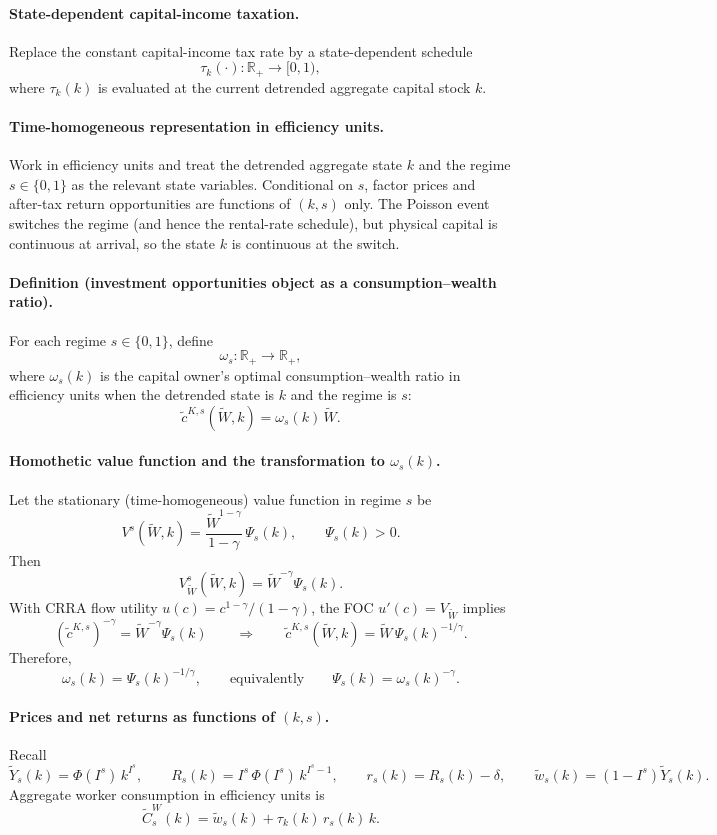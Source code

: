 \documentclass{article}
\begin{document}
\paragraph{State-dependent capital-income taxation.}
Replace the constant capital-income tax rate by a state-dependent schedule
$$
\tau_k(\cdot):\mathbb{R}_+\to[0,1),
$$
where $\tau_k(k)$ is evaluated at the current detrended aggregate capital stock $k$.

\paragraph{Time-homogeneous representation in efficiency units.}
Work in efficiency units and treat the detrended aggregate state $k$ and the regime $s\in\{0,1\}$ as the relevant state variables.
Conditional on $s$, factor prices and after-tax return opportunities are functions of $(k,s)$ only.
The Poisson event switches the regime (and hence the rental-rate schedule), but physical capital is continuous at arrival, so the state $k$ is continuous at the switch.

\paragraph{Definition (investment opportunities object as a consumption--wealth ratio).}
For each regime $s\in\{0,1\}$, define
$$
\omega_s:\mathbb{R}_+\to\mathbb{R}_+,
$$
where $\omega_s(k)$ is the capital owner's optimal consumption--wealth ratio in efficiency units when the detrended state is $k$ and the regime is $s$:
$$
\tilde c^{K,s}(\tilde W,k) = \omega_s(k)\,\tilde W.
$$

\paragraph{Homothetic value function and the transformation to $\omega_s(k)$.}
Let the stationary (time-homogeneous) value function in regime $s$ be
$$
V^s(\tilde W,k)=\frac{\tilde W^{1-\gamma}}{1-\gamma}\,\Psi_s(k),
\qquad \Psi_s(k)>0.
$$
Then
$$
V^s_{\tilde W}(\tilde W,k)=\tilde W^{-\gamma}\Psi_s(k).
$$
With CRRA flow utility $u(c)=c^{1-\gamma}/(1-\gamma)$, the FOC $u'(c)=V_{\tilde W}$ implies
$$
(\tilde c^{K,s})^{-\gamma}=\tilde W^{-\gamma}\Psi_s(k)
\qquad\Rightarrow\qquad
\tilde c^{K,s}(\tilde W,k)=\tilde W\,\Psi_s(k)^{-1/\gamma}.
$$
Therefore,
$$
\omega_s(k)=\Psi_s(k)^{-1/\gamma},
\qquad\text{equivalently}\qquad
\Psi_s(k)=\omega_s(k)^{-\gamma}.
$$

\paragraph{Prices and net returns as functions of $(k,s)$.}
Recall
$$
\tilde Y_s(k)=\Phi(I^s)\,k^{I^s},
\qquad
R_s(k)=I^s\,\Phi(I^s)\,k^{I^s-1},
\qquad
r_s(k)=R_s(k)-\delta,
\qquad
\tilde w_s(k)=(1-I^s)\tilde Y_s(k).
$$
Aggregate worker consumption in efficiency units is
$$
\tilde C^W_s(k)=\tilde w_s(k)+\tau_k(k)\,r_s(k)\,k.
$$
\end{document}
